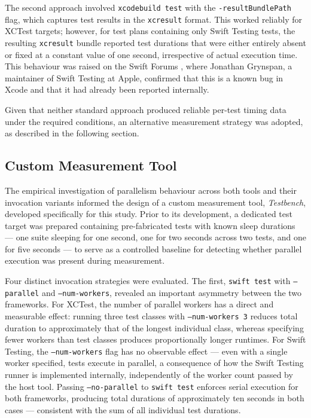 The second approach involved \texttt{xcodebuild test} with the
\texttt{-resultBundlePath} flag, which captures test results in the
\texttt{xcresult} format. This worked reliably for XCTest targets; however, for
test plans containing only Swift Testing tests, the resulting \texttt{xcresult}
bundle reported test durations that were either entirely absent or fixed at a
constant value of one second, irrespective of actual execution time. This behaviour
was raised on the Swift Forums \cite{TODO-forumpost}, where Jonathan Grynspan, a
maintainer of Swift Testing at Apple, confirmed that this is a known bug in Xcode
and that it had already been reported internally.

Given that neither standard approach produced reliable per-test timing data under
the required conditions, an alternative measurement strategy was adopted, as
described in the following section.

\subsection{Custom Measurement Tool}

The empirical investigation of parallelism behaviour across both tools and their
invocation variants informed the design of a custom measurement tool,
\textit{Testbench}, developed specifically for this study. Prior to its development,
a dedicated test target was prepared containing pre-fabricated tests with known sleep
durations --- one suite sleeping for one second, one for two seconds across two tests,
and one for five seconds --- to serve as a controlled baseline for detecting whether
parallel execution was present during measurement.

Four distinct invocation strategies were evaluated. The first, \texttt{swift test}
with \texttt{--parallel} and \texttt{--num-workers}, revealed an important asymmetry
between the two frameworks. For XCTest, the number of parallel workers has a direct
and measurable effect: running three test classes with \texttt{--num-workers 3}
reduces total duration to approximately that of the longest individual class, whereas
specifying fewer workers than test classes produces proportionally longer runtimes.
For Swift Testing, the \texttt{--num-workers} flag has no observable effect --- even
with a single worker specified, tests execute in parallel, a consequence of how the
Swift Testing runner is implemented internally, independently of the worker count
passed by the host tool. Passing \texttt{--no-parallel} to \texttt{swift test}
enforces serial execution for both frameworks, producing total durations of
approximately ten seconds in both cases --- consistent with the sum of all individual
test durations.

